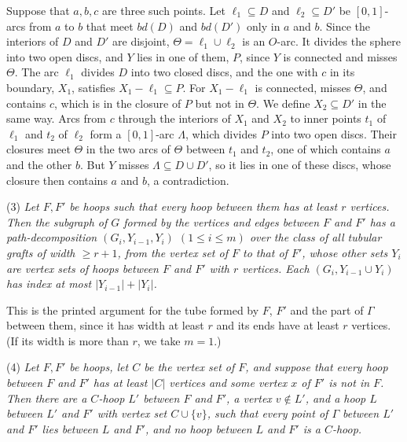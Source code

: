 {Suppose that $a, b, c$ are three such points. Let $\ell_1 \subseteq D$ and $\ell_2 \subseteq D'$ be $[0,1]$-arcs from $a$ to $b$ that meet $bd(D)$ and $bd(D')$ only in $a$ and $b$. Since the interiors of $D$ and $D'$ are disjoint, $\Theta = \ell_1 \cup \ell_2$ is an $O$-arc. It divides the sphere into two open discs, and $Y$ lies in one of them, $P$, since $Y$ is connected and misses $\Theta$. The arc $\ell_1$ divides $D$ into two closed discs, and the one with $c$ in its boundary, $X_1$, satisfies $X_1 - \ell_1 \subseteq P$. For $X_1 - \ell_1$ is connected, misses $\Theta$, and contains $c$, which is in the closure of $P$ but not in $\Theta$. We define $X_2 \subseteq D'$ in the same way. Arcs from $c$ through the interiors of $X_1$ and $X_2$ to inner points $t_1$ of $\ell_1$ and $t_2$ of $\ell_2$ form a $[0,1]$-arc $\Lambda$, which divides $P$ into two open discs. Their closures meet $\Theta$ in the two arcs of $\Theta$ between $t_1$ and $t_2$, one of which contains $a$ and the other $b$. But $Y$ misses $\Lambda \subseteq D \cup D'$, so it lies in one of these discs, whose closure then contains $a$ and $b$, a contradiction.

\hspace*{12pt}(3) \textit{Let $F, F'$ be hoops such that every hoop between them has at least $r$ vertices. Then the subgraph of $G$ formed by the vertices and edges between $F$ and $F'$ has a path-decomposition $(G_i, Y_{i-1}, Y_i)$ $(1 \le i \le m)$ over the class of all tubular grafts of width $\ge r + 1$, from the vertex set of $F$ to that of $F'$, whose other sets $Y_i$ are vertex sets of hoops between $F$ and $F'$ with $r$ vertices. Each $(G_i, Y_{i-1} \cup Y_i)$ has index at most $|Y_{i-1}| + |Y_i|$.}

This is the printed argument for the tube formed by $F$, $F'$ and the part of $\Gamma$ between them, since it has width at least $r$ and its ends have at least $r$ vertices. (If its width is more than $r$, we take $m = 1$.)

\hspace*{12pt}(4) \textit{Let $F, F'$ be hoops, let $C$ be the vertex set of $F$, and suppose that every hoop between $F$ and $F'$ has at least $|C|$ vertices and some vertex $x$ of $F'$ is not in $F$. Then there are a $C$-hoop $L'$ between $F$ and $F'$, a vertex $v \notin L'$, and a hoop $L$ between $L'$ and $F'$ with vertex set $C \cup \{v\}$, such that every point of $\Gamma$ between $L'$ and $F'$ lies between $L$ and $F'$, and no hoop between $L$ and $F'$ is a $C$-hoop.}

}
